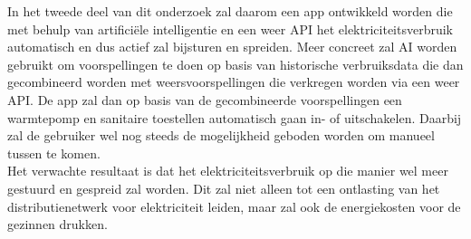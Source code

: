 \documentclass[dutch,dit,thesis]{hogentreport}
\begin{document}
In het tweede deel van dit onderzoek zal daarom een app ontwikkeld worden die met behulp van artificiële intelligentie en een weer API het elektriciteitsverbruik automatisch en dus actief zal bijsturen en spreiden. Meer concreet zal AI worden gebruikt om voorspellingen te doen op basis van historische verbruiksdata die dan gecombineerd worden met weersvoorspellingen die verkregen worden via een weer API. De app zal dan op basis van de gecombineerde voorspellingen een warmtepomp en sanitaire toestellen automatisch gaan in- of uitschakelen. Daarbij zal de gebruiker wel nog steeds de mogelijkheid geboden worden om manueel tussen te komen. \\

Het verwachte resultaat is dat het elektriciteitsverbruik op die manier wel meer gestuurd en gespreid zal worden. Dit zal niet alleen tot een ontlasting van het distributienetwerk voor elektriciteit leiden, maar zal ook de energiekosten voor de gezinnen drukken.



%


\backmatter{}

\printbibliography[heading=bibintoc]
\end{document}
